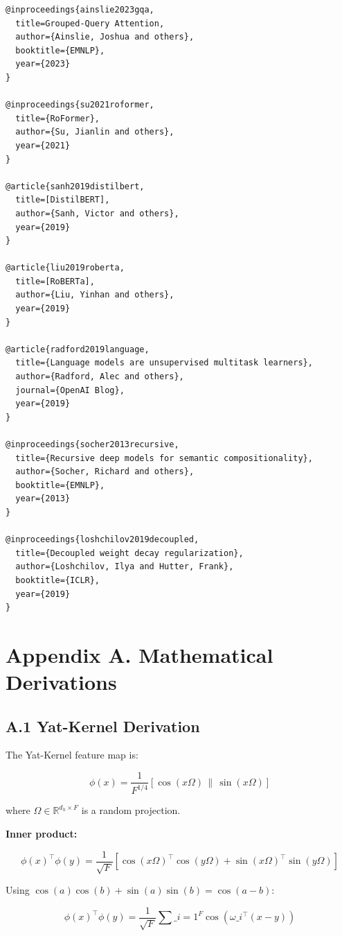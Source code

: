 \begin{lstlisting}
@inproceedings{ainslie2023gqa,
  title=Grouped-Query Attention,
  author={Ainslie, Joshua and others},
  booktitle={EMNLP},
  year={2023}
}

@inproceedings{su2021roformer,
  title={RoFormer},
  author={Su, Jianlin and others},
  year={2021}
}

@article{sanh2019distilbert,
  title=[DistilBERT],
  author={Sanh, Victor and others},
  year={2019}
}

@article{liu2019roberta,
  title=[RoBERTa],
  author={Liu, Yinhan and others},
  year={2019}
}

@article{radford2019language,
  title={Language models are unsupervised multitask learners},
  author={Radford, Alec and others},
  journal={OpenAI Blog},
  year={2019}
}

@inproceedings{socher2013recursive,
  title={Recursive deep models for semantic compositionality},
  author={Socher, Richard and others},
  booktitle={EMNLP},
  year={2013}
}

@inproceedings{loshchilov2019decoupled,
  title={Decoupled weight decay regularization},
  author={Loshchilov, Ilya and Hutter, Frank},
  booktitle={ICLR},
  year={2019}
}
\end{lstlisting}



\section{Appendix A. Mathematical Derivations}

\subsection{A.1 Yat-Kernel Derivation}

The Yat-Kernel feature map is:

\[
\phi(x) = \frac{1}{F^{1/4}} [\cos(x \Omega) \,\|\, \sin(x \Omega)]
\]

where $\Omega \in \mathbb{R}^{d_h \times F}$ is a random projection.

\textbf{Inner product:}

\[
\phi(x)^\top \phi(y) = \frac{1}{\sqrt{F}} [\cos(x\Omega)^\top \cos(y\Omega) 
+ \sin(x\Omega)^\top \sin(y\Omega)]
\]

Using $\cos(a)\cos(b) + \sin(a)\sin(b) = \cos(a - b)$:

\[
\phi(x)^\top \phi(y) = \frac{1}{\sqrt{F}} \sum\_{i=1}^{F} \cos(\omega\_i^\top (x - y))
\]

